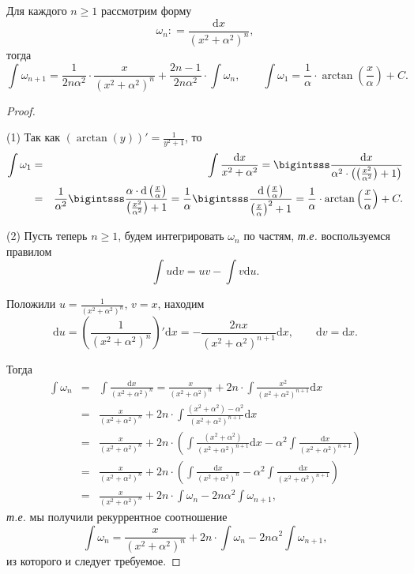 \begin{lemma}\label{int_of_x^2+a^2}
    Для каждого $n\ge 1$ рассмотрим форму
    \[
     \omega_n: = \frac{\mathrm{d}x}{(x^2 + \alpha^2)^n},
    \]
    тогда
    \[
     \int \omega_{n+1} = \frac{1}{2n\alpha^2}\cdot \frac{x}{(x^2 + \alpha^2)^n} + \frac{2n-1}{2n\alpha^2} \cdot\int \omega_n, \qquad \int \omega_1 = \frac{1}{\alpha} \cdot \arctan\left( \frac{x}{\alpha}\right) + C.
    \]
\end{lemma}
\begin{proof}~

(1) Так как $(\arctan(y))' = \frac{1}{y^2 + 1}$, то
\begin{eqnarray*}
    \int \omega_1 &=& \int \frac{\mathrm{d}x}{x^2 + \alpha^2}  = \bigintsss \frac{\mathrm{d}x}{\alpha^2\cdot\left (\left( \frac{x^2}{\alpha^2} \right) + 1\right)}\\
    &=& \frac{1}{\alpha^2} \bigintsss \frac{\alpha \cdot\mathrm{d}\left(\frac{x}{\alpha}\right)}{\left( \frac{x^2}{\alpha^2} \right) + 1} = \frac{1}{\alpha} \bigintsss \frac{ \mathrm{d}\left(\frac{x}{\alpha}\right)}{\left( \frac{x}{\alpha} \right)^2 + 1} = \frac{1}{\alpha} \cdot \arctan\left( \frac{x}{\alpha}\right) + C.
\end{eqnarray*}

(2) Пусть теперь $n \ge 1$, будем интегрировать $\omega_n$ по частям, \textit{т.е.} воспользуемся правилом
\[
 \int u \mathrm{d}v = uv - \int v \mathrm{d}u.
\]

Положили $u = \frac{1}{(x^2 + \alpha^2)^n}$, $v = x$, находим
\[
 \mathrm{d}u = \left( \frac{1}{(x^2 + \alpha^2)^n} \right)'\mathrm{d}x = - \frac{2nx}{(x^2 + \alpha^2)^{n+1}}\mathrm{d}x, \qquad \mathrm{d}v = \mathrm{d}x.
\]

Тогда
\begin{eqnarray*}
    \int \omega_n &=& \int \frac{\mathrm{d}x}{(x^2 + \alpha^2)^n} = \frac{x}{(x^2 + \alpha^2)^n} + 2n \cdot \int \frac{x^2}{(x^2 + \alpha^2)^{n+1}}\mathrm{d}x \\
    &=& \frac{x}{(x^2 + \alpha^2)^n} + 2n \cdot \int \frac{(x^2+\alpha^2) - \alpha^2}{(x^2 + \alpha^2)^{n+1}}\mathrm{d}x \\
    &=& \frac{x}{(x^2 + \alpha^2)^n} + 2n \cdot \left( \int \frac{(x^2+\alpha^2)}{(x^2 + \alpha^2)^{n+1}}\mathrm{d}x - \alpha^2 \int  \frac{\mathrm{d}x}{(x^2 + \alpha^2)^{n+1}}\right) \\
    &=& \frac{x}{(x^2 + \alpha^2)^n} + 2n \cdot \left( \int \frac{\mathrm{d}x}{(x^2 + \alpha^2)^{n}} - \alpha^2 \int  \frac{\mathrm{d}x}{(x^2 + \alpha^2)^{n+1}}\right) \\
    &=&\frac{x}{(x^2 + \alpha^2)^n} + 2n\cdot \int \omega_n  - 2n\alpha^2 \int \omega_{n+1},
\end{eqnarray*}
\textit{т.е.} мы получили рекуррентное соотношение 
\[
 \int \omega_n = \frac{x}{(x^2 + \alpha^2)^n} + 2n\cdot \int \omega_n  - 2n\alpha^2 \int \omega_{n+1},
\]
из которого и следует требуемое.    
\end{proof}


